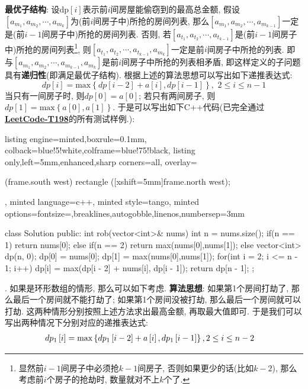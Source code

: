 \documentclass{article}
\begin{document}
\begin{homeworkProblem}
	\textbf{最优子结构}: 设$\text{dp}[i]$表示前$i$间房屋能偷窃到的最高总金额, 假设$\left[ a_{m_1},a_{m_2},\cdots ,a_{m_k} \right] $为(前$i$间房子中)所抢的房间列表, 那么$\left[ a_{m_1},a_{m_2},\cdots ,a_{m_{k-1}} \right]$一定是(前$i-1$间房子中)所抢的房间列表. 否则, 若$\left[ a_{t_1},a_{t_2},\cdots ,a_{t_{k-1}} \right]$是(前$i-1$间房子中)所抢的房间列表\footnote{显然前$i-1$间房子中必须抢$k-1$间房子, 否则如果更少的话(比如$k-2$), 那么考虑前$i$个房子的抢劫时, 数量就对不上$k$个了.}, 则$\left[ a_{t_1},a_{t_2},\cdots ,a_{t_{k-1}},a_{m_k} \right] $一定是前$i$间房子中所抢的列表. 即与$\left[ a_{m_1},a_{m_2},\cdots ,a_{m_{k-1}},a_{m_k} \right] $是前$i$间房子中所抢的列表相矛盾, 即这样定义的子问题具有\textbf{递归性}(即满足最优子结构). 根据上述的算法思想可以写出如下递推表达式:
	$$
	dp\left[ i \right] =\text{max} \left\{ dp\left[ i-2 \right] +a\left[ i \right] ,dp\left[ i-1 \right] \right\} , \,\,  2\le i\le n-1
	$$
	当只有一间房子时, 则$dp[0]=a[0]$; 若只有两间房子, 则$dp[1]=\text{max}\left\{ a[0], a[1] \right\}$. 于是可以写出如下C++代码(已完全通过\href{https://leetcode.cn/problems/house-robber/description/}{\textbf{LeetCode-T198}}的所有测试样例.):
\begin{tcblisting}{listing engine=minted,boxrule=0.1mm,
colback=blue!5!white,colframe=blue!75!black,
listing only,left=5mm,enhanced,sharp corners=all,
overlay={\begin{tcbclipinterior} (frame.south west)
rectangle ([xshift=5mm]frame.north west);\end{tcbclipinterior}},
minted language=c++,
minted style=tango,
minted options={fontsize=\small,breaklines,autogobble,linenos,numbersep=3mm}}
class Solution {
public:
    int rob(vector<int>& nums) {
        int n = nums.size();
        if(n == 1) {
            return nums[0];
        }
        else if(n == 2) {
            return max(nums[0],nums[1]);
        }
        else {
            vector<int> dp(n, 0);
            dp[0] = nums[0];
            dp[1] = max(nums[0],nums[1]);
            for(int i = 2; i <= n - 1; i++) {
                dp[i] = max(dp[i - 2] + nums[i], dp[i - 1]);
            }
            return dp[n - 1];
        }
    }
};
\end{tcblisting}
	. 如果是环形数组的情形, 那么可以如下考虑. \textbf{算法思想}: 如果第1个房间打劫了, 那么最后一个房间就不能打劫了; 如果第1个房间没被打劫, 那么最后一个房间就可以打劫. 这两种情形分别按照上述方法求出最高金额, 再取最大值即可. 于是我们可以写出两种情况下分别对应的递推表达式:
	\begin{align}
		dp_1\left[ i \right] &=\text{max} \left\{ dp_1\left[ i-2 \right] +a\left[ i \right] ,dp_1\left[ i-1 \right] \right\} ,  2\le i\le n-2 \notag

\end{align}
\end{homeworkProblem}
\end{document}
